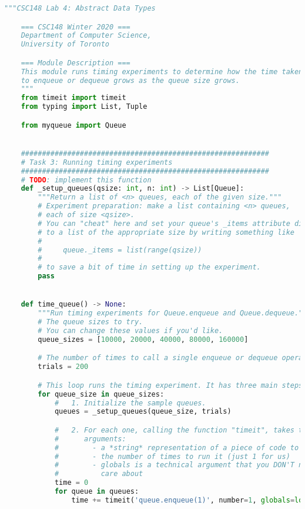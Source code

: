 \documentclass[12pt]{article}
\begin{document}
\begin{lstlisting}[language=Python,caption={timequeue.py},captionpos=b]
    """CSC148 Lab 4: Abstract Data Types

    === CSC148 Winter 2020 ===
    Department of Computer Science,
    University of Toronto

    === Module Description ===
    This module runs timing experiments to determine how the time taken
    to enqueue or dequeue grows as the queue size grows.
    """
    from timeit import timeit
    from typing import List, Tuple

    from myqueue import Queue


    ###########################################################
    # Task 3: Running timing experiments
    ###########################################################
    # TODO: implement this function
    def _setup_queues(qsize: int, n: int) -> List[Queue]:
        """Return a list of <n> queues, each of the given size."""
        # Experiment preparation: make a list containing <n> queues,
        # each of size <qsize>.
        # You can "cheat" here and set your queue's _items attribute directly
        # to a list of the appropriate size by writing something like
        #
        #     queue._items = list(range(qsize))
        #
        # to save a bit of time in setting up the experiment.
        pass


    def time_queue() -> None:
        """Run timing experiments for Queue.enqueue and Queue.dequeue."""
        # The queue sizes to try.
        # You can change these values if you'd like.
        queue_sizes = [10000, 20000, 40000, 80000, 160000]

        # The number of times to call a single enqueue or dequeue operation.
        trials = 200

        # This loop runs the timing experiment. It has three main steps:
        for queue_size in queue_sizes:
            #   1. Initialize the sample queues.
            queues = _setup_queues(queue_size, trials)

            #   2. For each one, calling the function "timeit", takes three
            #      arguments:
            #        - a *string* representation of a piece of code to run
            #        - the number of times to run it (just 1 for us)
            #        - globals is a technical argument that you DON'T need to
            #          care about
            time = 0
            for queue in queues:
                time += timeit('queue.enqueue(1)', number=1, globals=locals())


\end{lstlisting}
\end{document}
